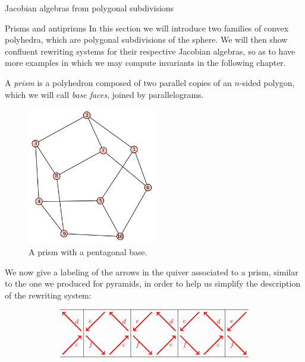 \begin{chapter}{Jacobian algebras from polygonal subdivisions}
\begin{section}{Prisms and antiprisms}
In this section we will introduce two families of convex polyhedra, which are polygonal subdivisions of the sphere. We will then show confluent rewriting systems for their respective Jacobian algebras, so as to have more examples in which we may compute invariants in the following chapter.

A \emph{prism} is a polyhedron composed of two parallel copies of an $n$-sided polygon, which we will call \emph{base faces}, joined by parallelograms.

\begin{figure}[h]
\centering
	\includegraphics[width=0.5\textwidth]{prism.png}
\caption{A prism with a pentagonal base.}
\end{figure}

We now give a labeling of the arrows in the quiver associated to a prism, similar to the one we produced for pyramids, in order to help us simplify the description of the rewriting system:

\[
\begin{tikzpicture}[text width=1.5mm, font=\footnotesize]
\draw (-4, 0) -- (4, 0);
\draw (-4, 2) -- (4, 2);
\foreach \x in {-3,-1,...,3}
\draw (\x, 0) -- (\x, 2);
\foreach \x in {-3,-1,1}
{
\draw[->, red, very thick] (\x+1.1, 0.1) to node[right]{$c$} (\x+1.9, 0.9);
\draw[->, red, very thick] (\x+1.9, 1.1) to node[right]{$d$} (\x+1.1, 1.9);
\draw[->, red, very thick] (\x+0.9, 1.9) to node[left]{$e$} (\x+0.1, 1.1);
\draw[->, red, very thick] (\x+0.1, 0.9) to node[left]{$f$} (\x+0.9, 0.1);
}
\draw[->, red, very thick] (-5+1.1, 0.1) to node[right]{$c$} (-5+1.9, 0.9);
\draw[->, red, very thick] (-5+1.9, 1.1) to node[right]{$d$} (-5+1.1, 1.9);
\draw[->, red, very thick] (3+0.9, 1.9) to node[left]{$e$} (3+0.1, 1.1);
\draw[->, red, very thick] (3+0.1, 0.9) to node[left]{$f$} (3+0.9, 0.1);


\end{tikzpicture}\]
\end{section}
\end{chapter}
